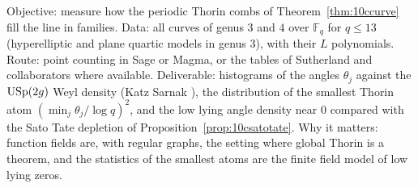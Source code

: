 \begin{compproblem}
Objective: measure how the periodic Thorin combs of Theorem~\ref{thm:10ccurve} fill the line in families. Data: all curves of genus $3$ and $4$ over $\mathbb F_q$ for $q\le13$ (hyperelliptic and plane quartic models in genus $3$), with their $L$ polynomials. Route: point counting in Sage or Magma, or the tables of Sutherland and collaborators where available. Deliverable: histograms of the angles $\theta_j$ against the $\mathrm{USp}(2g)$ Weyl density (Katz Sarnak \cite{katzsarnak1999}), the distribution of the smallest Thorin atom $(\min_j\theta_j/\log q)^2$, and the low lying angle density near $0$ compared with the Sato Tate depletion of Proposition~\ref{prop:10csatotate}. Why it matters: function fields are, with regular graphs, the setting where global Thorin is a theorem, and the statistics of the smallest atoms are the finite field model of low lying zeros.
\end{compproblem}
